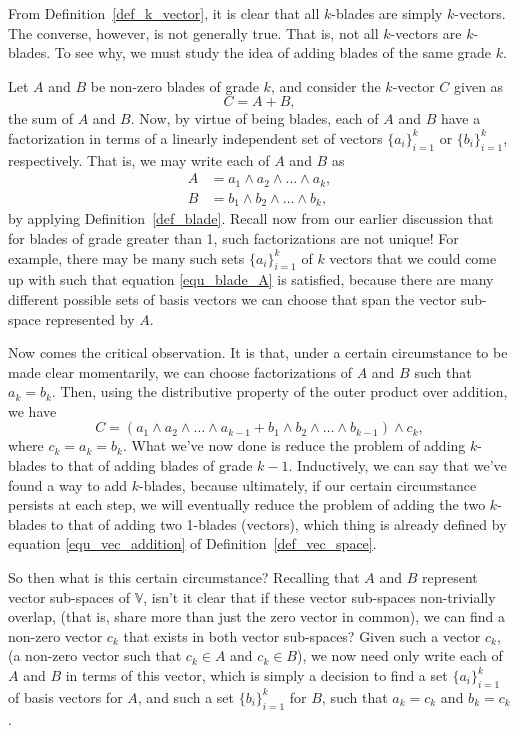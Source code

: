 \documentclass[12pt]{article}
\numberwithin{equation}{section}
\newcommand{\V}{\mathbb{V}}
\begin{document}
From Definition~\ref{def_k_vector}, it is clear that all $k$-blades are simply
$k$-vectors.  The converse, however, is not generally true.
That is, not all $k$-vectors are
$k$-blades.  To see why, we must study the idea of adding blades of the
same grade $k$.

Let $A$ and $B$ be non-zero blades of grade $k$, and consider the $k$-vector
$C$ given as
\begin{equation}
C = A + B,
\end{equation}
the sum of $A$ and $B$.  Now, by virtue of being blades, each of
$A$ and $B$ have a factorization in terms of a
linearly independent set of vectors $\{a_i\}_{i=1}^k$ or $\{b_i\}_{i=1}^k$,
respectively.  That is, we may write each of $A$ and $B$ as
\begin{align}
A &= a_1\wedge a_2\wedge\dots\wedge a_k, \label{equ_blade_A}\\
B &= b_1\wedge b_2\wedge\dots\wedge b_k,\label{equ_blade_B}
\end{align}
by applying Definition~\ref{def_blade}.
Recall now from our earlier discussion that for blades of grade greater than 1,
such factorizations are not unique!
For example, there may be many such sets $\{a_i\}_{i=1}^k$ of $k$ vectors
that we could come up with such that equation \eqref{equ_blade_A} is satisfied,
because there are many different possible sets of basis vectors we can choose that
span the vector sub-space represented by $A$.

Now comes the critical observation.  It is that, under a certain circumstance to
be made clear momentarily, we
can choose factorizations of $A$ and $B$ such that $a_k=b_k$.  Then, using
the distributive property of the outer product over addition, we have
\begin{equation}
C = (a_1\wedge a_2\wedge\dots\wedge a_{k-1}+b_1\wedge b_2\wedge\dots\wedge b_{k-1})\wedge c_k,
\end{equation}
where $c_k=a_k=b_k$.  What we've now done is reduce the problem of adding
$k$-blades to that of adding blades of grade $k-1$.  Inductively, we can say that we've
found a way to add $k$-blades, because ultimately, if our certain circumstance persists at each step,
we will eventually reduce the problem of adding the two $k$-blades to that
of adding two 1-blades (vectors), which thing is already defined by equation
\eqref{equ_vec_addition} of Definition~\ref{def_vec_space}.

So then what is this certain circumstance?  Recalling that $A$ and $B$ represent
vector sub-spaces of $\V$, isn't it clear that if these vector sub-spaces
non-trivially overlap, (that is, share more than just the zero vector in common), we can find
a non-zero vector $c_k$ that exists in both vector sub-spaces?  Given such a
vector $c_k$, (a non-zero vector such that $c_k\in A$ and $c_k\in B$), we now
need only write each of $A$ and $B$ in terms of this
vector, which is simply a decision to find a set $\{a_i\}_{i=1}^k$ of
basis vectors for $A$, and such a set $\{b_i\}_{i=1}^k$ for $B$,
such that $a_k=c_k$ and $b_k=c_k$.
\end{document}
